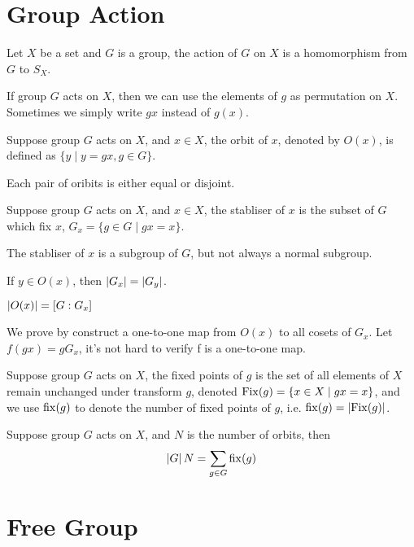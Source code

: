 \section{Group Action}
\begin{defi}
Let $X$ be a set and $G$ is a group, the action of $G$ on $X$ is a homomorphism from $G$ to $S_X$.
\end{defi}
If group $G$ acts on $X$, then we can use the elements of $g$ as permutation on $X$. Sometimes we simply write $gx$ instead of $g(x)$.
\begin{defi}[orbit]
Suppose group $G$ acts on $X$, and $x \in X$, the orbit of $x$, denoted by $O(x)$, is defined as $\{y \mid y=gx, g \in G\}$.
\end{defi}
\begin{pro}
Each pair of oribits is either equal or disjoint.
\end{pro}
\begin{defi}[stabliser]
Suppose group $G$ acts on $X$, and $x \in X$, the stabliser of $x$ is the subset of $G$ which fix $x$, $G_x =\{g \in G \mid gx=x\}$.
\end{defi}
\begin{pro}
The stabliser of $x$ is a subgroup of $G$, but not always a normal subgroup.
\end{pro}
\begin{pro}
If $y \in O(x)$, then $\left| {G_x} \right|=\left| {G_y} \right|$.
\end{pro}
\begin{thm}
$\left| {O(x)} \right|=[G:G_x]$
\end{thm}
\begin{prf}
We prove by construct a one-to-one map from $O(x)$ to all cosets of $G_x$. Let $f(gx)=gG_x$, it’s not hard to verify f is a one-to-one map.
\end{prf}
\begin{defi}
Suppose group $G$ acts on $X$, the fixed points of $g$ is the set of all elements of $X$ remain unchanged under transform $g$,
denoted $\mathop{\mathrm{Fix}}(g)=\{x \in X \mid gx=x\}$, and we use $\mathop{\mathrm{fix}}(g)$ to denote the number of fixed points of $g$, i.e. $\mathop{\mathrm{fix}}(g)=\left| {\mathop{\mathrm{Fix}}(g)} \right|$.
\end{defi}
\begin{thm}
Suppose group $G$ acts on $X$, and $N$ is the number of orbits, then $$\left| {G} \right|N = \sum_{g \in G} \mathop{\mathrm{fix}}(g)$$
\end{thm}\section{Free Group}

